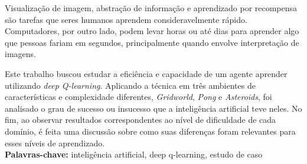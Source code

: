 Visualização de imagem, abstração de informação e aprendizado por recompensa são tarefas que seres humanos aprendem consideravelmente rápido.
Computadores, por outro lado, podem levar horas ou até dias para aprender algo que pessoas fariam em segundos, principalmente quando envolve interpretação de imagens.

Este trabalho buscou estudar a eficiência e capacidade de um agente aprender utilizando \textit{deep Q-learning}.
Aplicando a técnica em três ambientes de características e complexidade diferentes, \textit{Gridworld}, \textit{Pong} e \textit{Asteroids}, foi analisado o grau de sucesso ou insucesso que a inteligência artificial teve neles.
No fim, ao observar resultados correspondentes ao nível de dificuldade de cada domínio, é feita uma discussão sobre como suas diferenças foram relevantes para esses níveis de aprendizado.
\\





\noindent%
\textbf{Palavras-chave:} inteligência artificial, deep q-learning, estudo de caso

%
%
